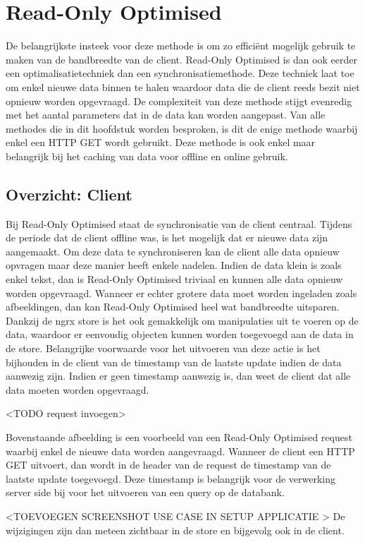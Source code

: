 \section{Read-Only Optimised}
De belangrijkste insteek voor deze methode is om zo effici\"ent mogelijk gebruik te maken van de bandbreedte van de client. Read-Only Optimised is dan ook eerder een optimalisatietechniek dan een synchronisatiemethode. Deze techniek laat toe om enkel nieuwe data binnen te halen waardoor data die de client reeds bezit niet opnieuw worden opgevraagd. De complexiteit van deze methode stijgt evenredig met het aantal parameters dat in de data kan worden aangepast. Van alle methodes die in dit hoofdstuk worden besproken, is dit de enige methode waarbij enkel een HTTP GET wordt gebruikt. Deze methode is ook enkel maar belangrijk bij het caching van data voor offline en online gebruik.
\subsection{Overzicht: Client}
Bij Read-Only Optimised staat de synchronisatie van de client centraal. Tijdens de periode dat de client offline was, is het mogelijk dat er nieuwe data zijn aangemaakt. Om deze data te synchroniseren kan de client alle data opnieuw opvragen maar deze manier heeft enkele nadelen. Indien de data klein is zoals enkel tekst, dan is Read-Only Optimised triviaal en kunnen alle data opnieuw worden opgevraagd. Wanneer er echter grotere data moet worden ingeladen zoals afbeeldingen, dan kan Read-Only Optimised heel wat bandbreedte uitsparen. Dankzij de ngrx store is het ook gemakkelijk om manipulaties uit te voeren op de data, waardoor er eenvoudig objecten kunnen worden toegevoegd aan de data in de store. Belangrijke voorwaarde voor het uitvoeren van deze actie is het bijhouden in de client van de timestamp van de laatste update indien de data aanwezig zijn. Indien er geen timestamp aanwezig is, dan weet de client dat alle data moeten worden opgevraagd.

<TODO request invoegen>

Bovenstaande afbeelding is een voorbeeld van een Read-Only Optimised request waarbij enkel de nieuwe data worden aangevraagd. Wanneer de client een HTTP GET uitvoert, dan wordt in de header van de request de timestamp van de laatste update toegevoegd. Deze timestamp is belangrijk voor de verwerking server side bij voor het uitvoeren van een query op de databank.

<TOEVOEGEN SCREENSHOT USE CASE IN SETUP APPLICATIE >
De wijzigingen zijn dan meteen zichtbaar in de store en bijgevolg ook in de client.
